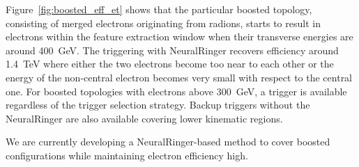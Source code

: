 
Figure~\ref{fig:boosted_eff_et} shows that the particular boosted topology,
consisting of merged electrons originating from radions, starts to result in
electrons within the feature extraction window when their transverse energies
are around \SI{400}{\GeV}. The triggering with NeuralRinger recovers efficiency around
\SI{1.4}{\TeV} where either the two electrons become too near to each other or
the energy of the non-central electron becomes very small with respect to the
central one. For boosted topologies with electrons above \SI{300}{\GeV}, a
trigger is available regardless of the trigger selection strategy. Backup
triggers without the NeuralRinger are also available covering lower kinematic regions.

We are currently developing a NeuralRinger-based method to cover boosted
configurations while maintaining electron efficiency high.


